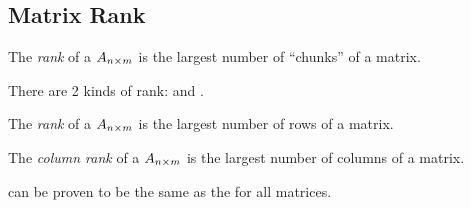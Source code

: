 \subsection{Matrix Rank}\label{subsec:Matrix_Rank}
\begin{definition}[Rank]\label{def:Matrix_Rank}
  The \emph{rank} of a  $A_{n \times m}$ is the largest number of  ``chunks'' of a matrix.

  There are 2 kinds of rank:  and .

  \begin{remark}\label{rmk:Row_Rank}
    The \emph{rank} of a  $A_{n \times m}$ is the largest number of  rows of a matrix.
  \end{remark}

  \begin{remark}\label{rmk:Column_Rank}
    The \emph{column rank} of a  $A_{n \times m}$ is the largest number of  columns of a matrix.
  \end{remark}

  \begin{remark}
     can be proven to be the same as the  for all matrices.
  \end{remark}
\end{definition}

